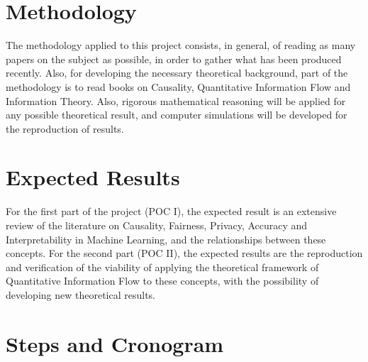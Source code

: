 \documentclass{article}
\begin{document}
\section{Methodology}

The methodology applied to this project consists, in general, of reading as many papers on the subject as possible, in order to gather what has been produced recently. Also, for developing the necessary theoretical background, part of the methodology is to read books on Causality\cite{Causality}\cite{CausalInf}, Quantitative Information Flow\cite{QIF} and Information Theory\cite{InfoTheory}. Also, rigorous mathematical reasoning will be applied for any possible theoretical result, and computer simulations will be developed for the reproduction of results.

\section{Expected Results}

For the first part of the project (POC I), the expected result is an extensive review of the literature on Causality, Fairness, Privacy, Accuracy and Interpretability in Machine Learning, and the relationships between these concepts. For the second part (POC II), the expected results are the reproduction and verification of the viability of applying the theoretical framework of Quantitative Information Flow to these concepts, with the possibility of developing new theoretical results. 

\section{Steps and Cronogram}
\end{document}
